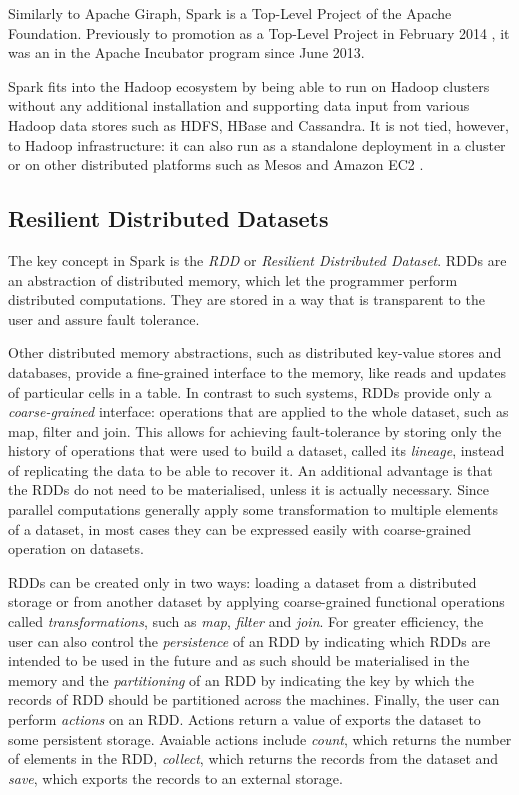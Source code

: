 \documentclass{pracamgr}
\theoremstyle{plain}
\theoremstyle{definition}
\theoremstyle{remark}
\begin{document}
Similarly to Apache Giraph, Spark is a Top-Level Project of the Apache Foundation. Previously to promotion as a Top-Level Project in February 2014 \cite{sparktoplevel}, it was an in the Apache Incubator program since June 2013. 

Spark fits into the Hadoop ecosystem by being able to run on Hadoop clusters without any additional installation and supporting data input from various Hadoop data stores such as HDFS, HBase and Cassandra. It is not tied, however, to Hadoop infrastructure: it can also run as a standalone deployment in a cluster or on other distributed platforms such as Mesos \cite{mesos} and Amazon EC2 \cite{ec2}.

\subsection{Resilient Distributed Datasets}
The key concept in Spark is the \emph{RDD} or \emph{Resilient Distributed Dataset}. RDDs are an abstraction of distributed memory, which let the programmer perform distributed computations. They are stored in a way that is transparent to the user and assure fault tolerance.

Other distributed memory abstractions, such as distributed key-value stores and databases, provide a fine-grained interface to the memory, like reads and updates of particular cells in a table. In contrast to such systems, RDDs provide only a \emph{coarse-grained} interface: operations that are applied to the whole dataset, such as map, filter and join. This allows for achieving fault-tolerance by storing only the history of operations that were used to build a dataset, called its \emph{lineage}, instead of replicating the data to be able to recover it. An additional advantage is that the RDDs do not need to be materialised, unless it is actually necessary. Since parallel computations generally apply some transformation to multiple elements of a dataset, in most cases they can be expressed easily with coarse-grained operation on datasets.

RDDs can be created only in two ways: loading a dataset from a distributed storage or from another dataset by applying coarse-grained functional operations called \emph{transformations}, such as \emph{map}, \emph{filter} and \emph{join}. For greater efficiency, the user can also control the \emph{persistence} of an RDD by indicating which RDDs are intended to be used in the future and as such should be materialised in the memory and the \emph{partitioning} of an RDD by indicating the key by which the records of RDD should be partitioned across the machines. Finally, the user can perform \emph{actions} on an RDD. Actions return a value of exports the dataset to some persistent storage. Avaiable actions include \emph{count}, which returns the number of elements in the RDD, \emph{collect}, which returns the records from the dataset and \emph{save}, which exports the records to an external storage.
\end{document}
